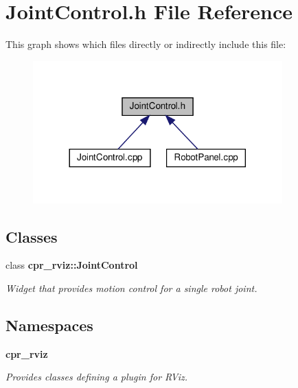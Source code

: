 \section{Joint\+Control.\+h File Reference}
\label{JointControl_8h}
This graph shows which files directly or indirectly include this file\+:
\nopagebreak
\begin{figure}[H]
\begin{center}
\leavevmode
\includegraphics[width=272pt]{JointControl_8h__dep__incl}
\end{center}
\end{figure}
\subsection*{Classes}
\begin{DoxyCompactItemize}
\item 
class \textbf{ cpr\+\_\+rviz\+::\+Joint\+Control}
\begin{DoxyCompactList}\small\item\em Widget that provides motion control for a single robot joint. \end{DoxyCompactList}\end{DoxyCompactItemize}
\subsection*{Namespaces}
\begin{DoxyCompactItemize}
\item 
 \textbf{ cpr\+\_\+rviz}
\begin{DoxyCompactList}\small\item\em Provides classes defining a plugin for R\+Viz. \end{DoxyCompactList}\end{DoxyCompactItemize}
